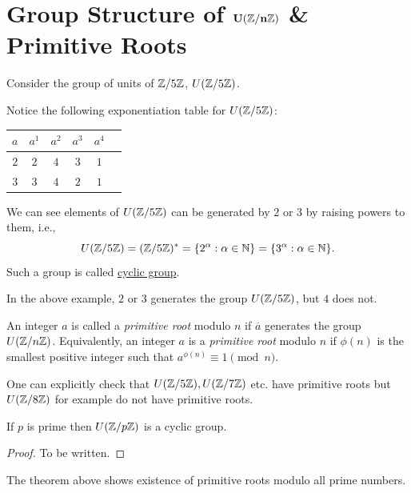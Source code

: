 \section{Group Structure of $\mathbf{U(\mathbb{Z}/n\mathbb{Z})}$ \& Primitive Roots}

Consider the group of units of $\mathbb{Z}/5\mathbb{Z}$, $U(\mathbb{Z}/5\mathbb{Z})$.

Notice the following exponentiation table for $U(\mathbb{Z}/5\mathbb{Z})$:

\begin{center}
    \begin{tabular}{c|ccccc}
        $a$ & $a^1$ & $a^2$ & $a^3$ & $a^4$\\
        \hline
        $2$ & $2$ & $4$ & $3$ & $1$\\
        \hline
        $3$ & $3$ & $4$ & $2$ & $1$\\
    \end{tabular}
\end{center}

We can see elements of $U(\mathbb{Z}/5\mathbb{Z})$ can be generated by $2$ or $3$ by raising powers to them, i.e., \[U(\mathbb{Z}/5\mathbb{Z}) = (\mathbb{Z}/5\mathbb{Z})^* = \{2^\alpha: \alpha \in \mathbb{N}\} = \{3^\alpha: \alpha \in \mathbb{N}\}.\] Such a group is called \hyperref[def:cyclic]{cyclic group}.

In the above example, $2$ or $3$ generates the group $U(\mathbb{Z}/5\mathbb{Z})$, but $4$ does not.

\begin{definition}
    An integer $a$ is called a \textit{primitive root} modulo $n$ if $\overline{a}$ generates the group $U(\mathbb{Z}/n\mathbb{Z})$. Equivalently, an integer $a$ is a \textit{primitive root} modulo $n$ if $\phi(n)$ is the smallest positive integer such that $a^{\phi(n)} \equiv 1 \pmod{n}$.
\end{definition}

One can explicitly check that $U(\mathbb{Z}/5\mathbb{Z}), U(\mathbb{Z}/7\mathbb{Z})$ etc. have primitive roots but $U(\mathbb{Z}/8\mathbb{Z})$ for example do not have primitive roots.

\begin{theorem}
    If $p$ is prime then $U(\mathbb{Z}/p\mathbb{Z})$ is a cyclic group.
\end{theorem}
\begin{proof}
    To be written.
\end{proof}

The theorem above shows existence of primitive roots modulo all prime numbers. 
